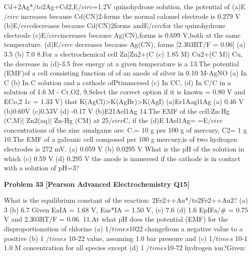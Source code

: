 \begin{problembox}
Cd+2Ag*$/to$2Ag+Cd$2$,E$/circ$=1.2V
quinohydrone solution, the potential of
(a)E$/circ$ increases because Cd(CN)$2$-forms
the normal calomel electrode is 0.279 V
(b)E$/circ$decreases because Cd(CN)$2$forms
andE$/circ$for the quinohydrone electrode
(c)E$/circ$increases because Ag(CN),forms
is 0.699 V,both at the same temperature.
(d)E$/circ$ decreases because Ag(CN), forms
[2.303RT/F = 0.06]
(a) 3.5
(b) 7.0
8.For a electrochemical cell Zn|Zn$2$+(C
(c) 1.85
M) Cu$2$+(C M)| Cu, the decrease in
(d)-3.5
free energy at a given temperature is a
13.The potential (EMF)of a cell consisting
function of
of an anode of silver in 0.10 M-AgNO
(a) In C
(b) In C
solution and a cathode ofPtimmersed
(c) In CC,
(d) In C/C
in a solution of 1.6 M - Cr,O$2$,
9.Select the correct option if it is known
= 0.80 V and ECo,2 1c = 1.33 V)
that K(AgCl)>K(AgBr)>K(AgI)
(a)Er1Aagl1Ag
(a) 0.46 V
(b)0.60V
(c)0.53V
(d) -0.17 V
(b)E$2$1Ael1Ag
14.The EMF of the cell:Zn-Hg (C,M)|
Zn$2$(aq)| Zn-Hg (CM) at 25$/circ$C, if the
(d)E IAel1Ag=
=E$/circ$
concentrations of the zinc amalgams are:
C,= 10 g per 100 g of mercury, C2= 1 g
10.The EMF of a galvanic cell composed
per 100 g mercury,is
of two hydrogen electrodes is 272 mV.
(a) 0.059 V
(b) 0.0295 V
What is the pH of the solution in which
(c) 0.59 V
(d) 0.295 V
the anode is immersed if the cathode is in
contact with a solution of pH=3?
\end{problembox}

\begin{problembox}
\textbf{Problem 33} \hfill \textbf{[Pearson Advanced Electrochemistry Q15]}
\label{q:ext-pearson-33}

What is the equilibrium constant of the
reaction: 2Fe$2$++Au*$/to$2Fe$2$++Au$2$?
(a) 3
(b) 6.7
Given EaIA = 1.68 V, Eas*IA = 1.50 V,
(c) 7.6
(d) 1.6
EpIFa/\# = 0.75 V and 2.303RT/F = 0.06.
11.At what pH does the potential (EMF)
for the disproportionation of chlorine
(a) 1$/times$1022
changefrom a negative value to a positive
(b) 1 $/times$ 10-22
value, assuming 1.0 bar pressure and
(c) 1$/times$ 10-1
1.0 M concentration for all species except
(d) 1 $/times$10-72
hydrogen ion?Given:
\end{problembox}

